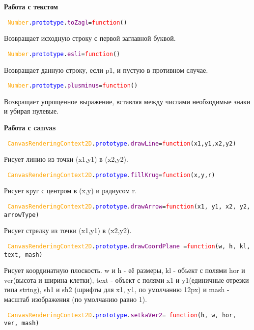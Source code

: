 \textbf{Работа с текстом}

\hypertarget{toZagl}{\texttt{
		\textcolor{Orange}{Number}.\textcolor{Blue}{prototype}.\textcolor{Purple}{toZagl}=\textcolor{Red}{function}()
	}}

Возвращает исходную строку с первой заглавной буквой.

\texttt{
	\textcolor{Orange}{Number}.\textcolor{Blue}{prototype}.\textcolor{Purple}{esli}=\textcolor{Red}{function}()
}

Возвращает данную строку, если p1, и пустую в противном случае.

\texttt{
	\textcolor{Orange}{Number}.\textcolor{Blue}{prototype}.\textcolor{Purple}{plusminus}=\textcolor{Red}{function}()
}

Возвращает упрощенное выражение, вставляя между числами необходимые знаки и убирая нулевые.

\textbf{Работа с canvas}

\texttt{
	\textcolor{Orange}{CanvasRenderingContext2D}.\textcolor{Blue}{prototype}.\textcolor{Purple}{drawLine}=\textcolor{Red}{function}(x1,y1,x2,y2)
}

Рисует линию из точки (x1,y1) в (x2,y2).

\texttt{
	\textcolor{Orange}{CanvasRenderingContext2D}.\textcolor{Blue}{prototype}.\textcolor{Purple}{fillKrug}=\textcolor{Red}{function}(x,y,r)
}

Рисует круг с центром в (x,y) и радиусом r.

\texttt{
	\textcolor{Orange}{CanvasRenderingContext2D}.\textcolor{Blue}{prototype}.\textcolor{Purple}{drawArrow}=\textcolor{Red}{function}(x1, y1, x2, y2, arrowType)
}%

Рисует стрелку из точки (x1,y1) в (x2,y2).

\hypertarget{drawCoordPlane}{\texttt{
		\textcolor{Orange}{CanvasRenderingContext2D}.\textcolor{Blue}{prototype}.\textcolor{Purple}{drawCoordPlane }=\textcolor{Red}{function}(w, h, kl, text, mash)
	}}

Рисует координатную плоскость. w и h  \-- её размеры, kl \-- объект с полями hor и ver(высота и ширина клетки), text \-- объект с полями x1 и y1(единичные отрезки типа string), sh1 и sh2 (шрифты для x1, y1, по умолчанию 12px) и mash - масштаб изображения (по умолчанию равно 1).

\texttt{
	\textcolor{Orange}{CanvasRenderingContext2D}.\textcolor{Blue}{prototype}.\textcolor{Purple}{setkaVer2}=
	\newline
	\textcolor{Red}{function}(h, w, hor, ver, mash)
}

